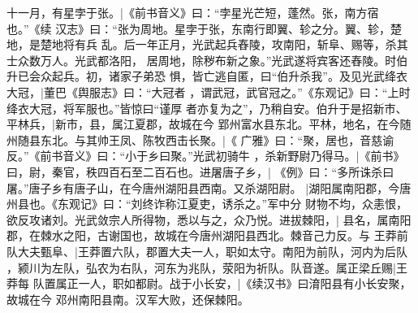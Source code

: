 \documentclass{article}
\begin{document}
\begin{withgezhu}
十一月，有星孛于张。|{《前书音义》曰：“孛星光芒短，蓬然。张，南方宿也。”《续
汉志》曰：“张为周地。星孛于张，东南行即翼、轸之分。翼、轸，楚地，是楚地将有兵
乱。后一年正月，光武起兵舂陵，攻南阳，斩阜、赐等，杀其士众数万人。光武都洛阳，
居周地，除秽布新之象。”}光武遂将宾客还舂陵。时伯升已会众起兵。初，诸家子弟恐
惧，皆亡逃自匿，曰“伯升杀我”。及见光武绛衣大冠，|{董巴《舆服志》曰：“大冠者
，谓武冠，武官冠之。”《东观记》曰：“上时绛衣大冠，将军服也。”}皆惊曰“谨厚
者亦复为之”，乃稍自安。伯升于是招新市、平林兵，|{新市，县，属江夏郡，故城在今
郢州富水县东北。平林，地名，在今随州随县东北。}与其帅王凤、陈牧西击长聚。|{《
广雅》曰：“聚，居也，音慈谕反。”《前书音义》曰：“小于乡曰聚。”}光武初骑牛
，杀新野尉乃得马。|{《前书》曰，尉，秦官，秩四百石至二百石也。}进屠唐子乡，|{
《例》曰：“多所诛杀曰屠。”唐子乡有唐子山，在今唐州湖阳县西南。}又杀湖阳尉。
|{湖阳属南阳郡，今唐州县也。《东观记》曰：“刘终诈称江夏吏，诱杀之。”}军中分
财物不均，众恚恨，欲反攻诸刘。光武敛宗人所得物，悉以与之，众乃悦。进拔棘阳，|{
县名，属南阳郡，在棘水之阳，古谢国也，故城在今唐州湖阳县西北。棘音己力反。}与
王莽前队大夫甄阜、|{王莽置六队，郡置大夫一人，职如太守。南阳为前队，河内为后队
，颍川为左队，弘农为右队，河东为兆队，荥阳为祈队。队音遂。}属正梁丘赐|{王莽每
队置属正一人，职如都尉。}战于小长安，|{《续汉书》曰淯阳县有小长安聚，故城在今
邓州南阳县南。}汉军大败，还保棘阳。

\end{withgezhu}
\end{document}
